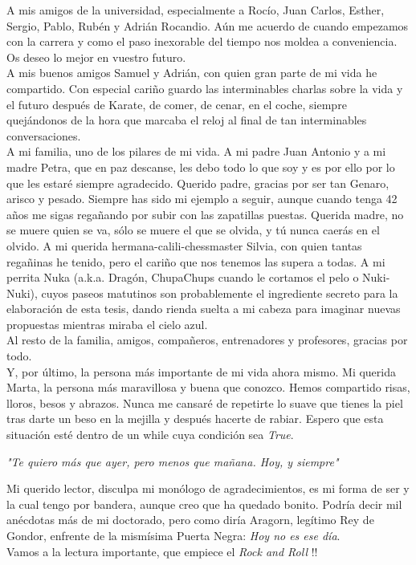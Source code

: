 A mis amigos de la universidad, especialmente a Rocío, Juan Carlos, Esther, Sergio, Pablo, Rubén y Adrián Rocandio. Aún me acuerdo de cuando empezamos con la carrera y como el paso inexorable del tiempo nos moldea a conveniencia. Os deseo lo mejor en vuestro futuro. \\

A mis buenos amigos Samuel y Adrián, con quien gran parte de mi vida he compartido. Con especial cariño guardo las interminables charlas sobre la vida y el futuro después de Karate, de comer, de cenar, en el coche, siempre quejándonos de la hora que marcaba el reloj al final de tan interminables conversaciones. \\

A mi familia, uno de los pilares de mi vida. A mi padre Juan Antonio y a mi madre Petra, que en paz descanse, les debo todo lo que soy y es por ello por lo que les estaré siempre agradecido. Querido padre, gracias por ser tan Genaro, arisco y pesado. Siempre has sido mi ejemplo a seguir, aunque cuando tenga 42 años me sigas regañando por subir con las zapatillas puestas. Querida madre, no se muere quien se va, sólo se muere el que se olvida, y tú nunca caerás en el olvido. A mi querida hermana-calili-chessmaster Silvia, con quien tantas regañinas he tenido, pero el cariño que nos tenemos las supera a todas. A mi perrita Nuka (a.k.a. Dragón, ChupaChups cuando le cortamos el pelo o Nuki-Nuki), cuyos paseos matutinos son probablemente el ingrediente secreto para la elaboración de esta tesis, dando rienda suelta a mi cabeza para imaginar nuevas propuestas mientras miraba el cielo azul. \\ 

Al resto de la familia, amigos, compañeros, entrenadores y profesores, gracias por todo. \\

Y, por último, la persona más importante de mi vida ahora mismo. Mi querida Marta, la persona más maravillosa y buena que conozco. Hemos compartido risas, lloros, besos y abrazos. Nunca me cansaré de repetirte lo suave que tienes la piel tras darte un beso en la mejilla y después hacerte de rabiar. Espero que esta situación esté dentro de un while cuya condición sea \textit{True}. 

\begin{center}
\textit{"Te quiero más que ayer, pero menos que mañana. Hoy, y siempre"}
\end{center}

Mi querido lector, disculpa mi monólogo de agradecimientos, es mi forma de ser y la cual tengo por bandera, aunque creo que ha quedado bonito. Podría decir mil anécdotas más de mi doctorado, pero como diría Aragorn, legítimo Rey de Gondor, enfrente de la mismísima Puerta Negra: \textit{Hoy no es ese día}. \\

Vamos a la lectura importante, que empiece el \textit{Rock and Roll} !!


